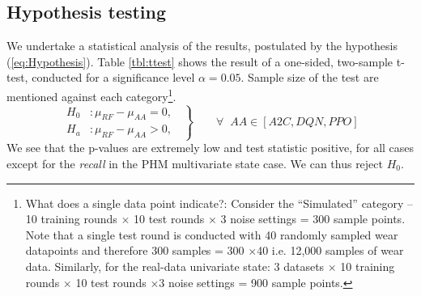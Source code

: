 \documentclass[a4paper, 12pt]{article}
\begin{document}
\subsection{Hypothesis testing}
We undertake a statistical analysis of the results, postulated by the hypothesis (\ref{eq:Hypothesis}). Table \ref{tbl:ttest} shows the result of a one-sided, two-sample t-test, conducted for a significance level $\alpha=0.05$. Sample size of the test are mentioned against each category\footnote{What does a single data point indicate?: Consider the ``Simulated'' category -- 10 training rounds $\times$ 10 test rounds $\times$ 3 noise settings = 300 sample points. Note that a single test round is conducted with 40 randomly sampled wear datapoints and therefore 300 samples = 300 $\times$40 i.e. 12,000 samples of wear data. Similarly, for the real-data univariate state: 3 datasets $\times$ 10 training rounds $\times$ 10 test rounds $\times$3 noise settings = 900 sample points.}.
\begin{equation}
	\left.\begin{aligned}
		H_0 & : \mu_{RF} - \mu_{AA} = 0,\;\; \\
		H_a & : \mu_{RF} - \mu_{AA} > 0, \;\;
	\end{aligned}
	\right\}
	\qquad \forall \;\; \text{$AA \in[A2C, DQN, PPO]$}
	\label{eq:Hypothesis}
\end{equation}
We see that the p-values are extremely low and test statistic positive, for all cases except for the \textit{recall} in the PHM multivariate state case. We can thus reject $H_0$.
\end{document}
